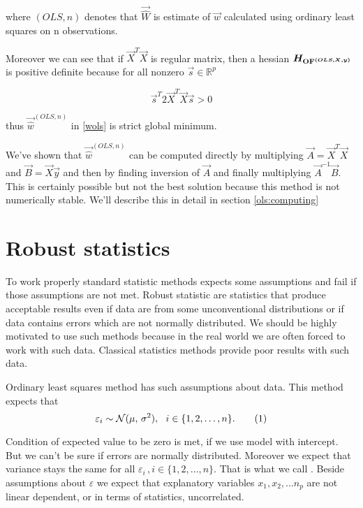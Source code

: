 where $(OLS,n)$ denotes that $\vec{\hat{W}}$ is estimate of $\vec{w}$ calculated using ordinary least squares on n observations. 

Moreover we can see that if $\vec{X}^T\vec{X}$ is regular matrix, then a hessian $\boldsymbol{H_{\operatorname{OF}^{(OLS,\boldsymbol{X}, \boldsymbol{y})}}}$ is positive definite because for all nonzero $\vec{s} \in \mathbb{R}^p$


\begin{equation}
    \vec{s}^T 2\vec{X}^T\vec{X} \vec{s} > 0
\end{equation}

thus $\vec{\hat{w}}^{(OLS,n)}$ in \eqref{wols} is strict global minimum.



We've shown that $\vec{\hat{w}}^{(OLS,n)}$ can be computed directly by multiplying $\vec{A} = \vec{X}^T\vec{X}$ and $\vec{B} = \vec{X}\vec{y}$ and then by finding inversion of $\vec{A}$  and finally multiplying $\vec{A}^{-1}\vec{B}$. This is certainly possible but not the best solution because this method is not numerically stable. We'll describe this in detail in section \ref{ols:computing}

\section{Robust statistics}
To work properly standard statistic methods expects some assumptions and fail if those assumptions are not met. Robust statistic are statistics that produce acceptable results even if data are from some unconventional distributions or if data contains errors which are not normally distributed. We should be highly motivated to use such methods because in the real world we are often forced to work with such data. Classical statistics methods provide poor results with such data. 

Ordinary least squares method has such assumptions about data. This method expects that
\begin{equation}
    \varepsilon_i \sim \mathcal{N}(\mu,\,\sigma^{2})\\, \ \ i \in \{{1,2,\ldots,n\}}. \numberthis
\end{equation}

Condition of expected value to be zero is met, if we use model with intercept. But we can't be sure if errors are normally distributed. Moreover we expect that variance stays the same for all $\varepsilon_i\,, i \in \{{1,2,\ldots,n\}}$. That is what we call . Beside assumptions about $\varepsilon$ we expect that explanatory variables $x_1,x_2,\ldots n_p$ are not linear dependent, or in terms of statistics, uncorrelated.

